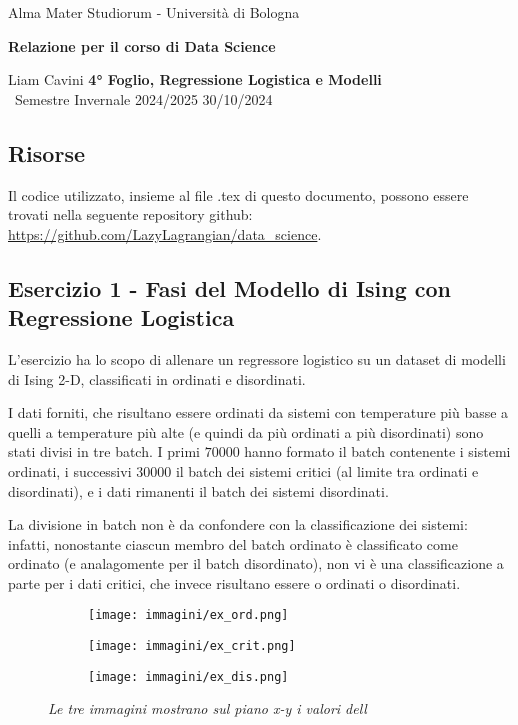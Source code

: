 \documentclass{article}
\begin{document}
\begin{center}
    {\Large Alma Mater Studiorum - Università di Bologna}
    
    \vspace{0.5cm}
    {\bf \large Relazione per il corso di Data Science}
\end{center} 

\noindent
{ Liam Cavini} \hfill {\bf 4° Foglio, Regressione Logistica e Modelli}\\
{\ Semestre Invernale 2024/2025} \hfill 30/10/2024

\subsection*{Risorse}
Il codice utilizzato, insieme al file .tex di questo documento, possono essere trovati nella seguente repository github: \url{https://github.com/LazyLagrangian/data_science}.

\subsection*{Esercizio 1 - Fasi del Modello di Ising con Regressione Logistica}
L'esercizio ha lo scopo di allenare un regressore logistico su un dataset di modelli di Ising 2-D, classificati in ordinati e disordinati.

I dati forniti, che risultano essere ordinati da sistemi con temperature più basse a quelli a temperature più alte (e quindi da più ordinati a più disordinati) sono stati divisi in tre batch.
I primi $70000$ hanno formato il batch contenente i sistemi ordinati, i successivi $30000$ il batch dei sistemi critici (al limite tra ordinati e disordinati), e i dati rimanenti il batch dei sistemi disordinati.

La divisione in batch non è da confondere con la classificazione dei sistemi:
infatti, nonostante ciascun membro del batch ordinato è classificato come ordinato (e analagomente per il batch disordinato), 
non vi è una classificazione a parte per i dati critici, che invece risultano essere o ordinati o disordinati.

\begin{figure}[H]
    \centering
    \begin{subfigure}{.30\textwidth}
       \centering
       \texttt{[image: immagini/ex\_ord.png]}
    \end{subfigure}
    \begin{subfigure}{.30\textwidth}
       \centering
       \texttt{[image: immagini/ex\_crit.png]}
   \end{subfigure} 
   \begin{subfigure}{.30\textwidth}
    \centering
    \texttt{[image: immagini/ex\_dis.png]}
    \end{subfigure} 
   \caption{\emph{Le tre immagini mostrano sul piano x-y i valori dell}}
   \label{fig:esempio_batch}
\end{figure}
\end{document}
